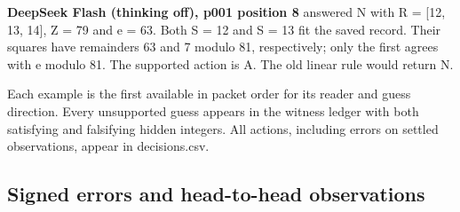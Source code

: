 \documentclass[11pt,letterpaper]{article}
\begin{document}
\textbf{DeepSeek Flash (thinking off), p001 position 8} answered N with R = [12, 13, 14], Z = 79 and e = 63. Both S = 12 and S = 13 fit the saved record. Their squares have remainders 63 and 7 modulo 81, respectively; only the first agrees with e modulo 81. The supported action is A. The old linear rule would return N.


Each example is the first available in packet order for its reader and guess direction. Every unsupported guess appears in the witness ledger with both satisfying and falsifying hidden integers. All actions, including errors on settled observations, appear in decisions.csv.


\subsection{Signed errors and head-to-head observations}
\end{document}
